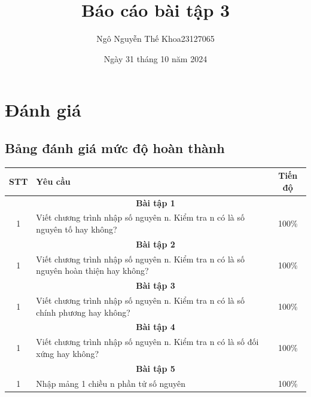 \documentclass[a4paper,12pt]{report}
\title{Báo cáo bài tập 3}
\author{\begin{tabular}{r c}
  Ngô Nguyễn Thế Khoa & 23127065
  \end{tabular}}
\date{Ngày 31 tháng 10 năm 2024}
\begin{document}

\tableofcontents\thispagestyle{empty}

\pagebreak
\section{Đánh giá}
\subsection*{Bảng đánh giá mức độ hoàn thành}
\begin{center}
	\renewcommand{\arraystretch}{1.5}
	\begin{tabular}{|c|p{}|c|}
		\hline
		\textbf{STT} & \textbf{Yêu cầu}                                                                     & \textbf{Tiến độ} \\\hline
		\multicolumn{3}{|c|}{\textbf{Bài tập 1}}                                                                               \\\hline
		1            & Viết chương trình nhập số nguyên n. Kiểm tra n có là số nguyên tố hay không?         & 100\%            \\\hline
		\multicolumn{3}{|c|}{\textbf{Bài tập 2}}                                                                               \\\hline
		1            & Viết chương trình nhập số nguyên n. Kiểm tra n có là số nguyên hoàn thiện hay không? & 100\%            \\\hline
		\multicolumn{3}{|c|}{\textbf{Bài tập 3}}                                                                               \\\hline
		1            & Viết chương trình nhập số nguyên n. Kiểm tra n có là số chính phương hay không?  & 100\%            \\\hline
		\multicolumn{3}{|c|}{\textbf{Bài tập 4}}                                                                               \\\hline
		1            & Viết chương trình nhập số nguyên n. Kiểm tra n có là số đối xứng hay không?          & 100\%            \\\hline
		\multicolumn{3}{|c|}{\textbf{Bài tập 5}}                                                                               \\\hline
		1            & Nhập mảng 1 chiều n phần tử số nguyên                                                & 100\%            \\\hline

\end{tabular}
\end{center}
\end{document}
